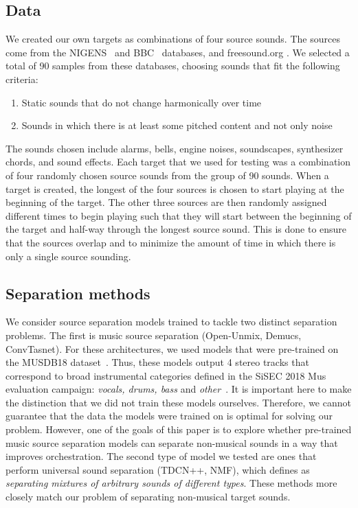 \documentclass[letterpaper]{article}  %
\begin{document}
    \subsection{Data}\label{subsec:data}
    We created our own targets as combinations of four source sounds. The sources come from the NIGENS~\cite{NIGENS} and BBC~\cite{BBC} databases, and freesound.org \cite{freesound}. We selected a total of 90 samples from these databases, choosing sounds that fit the following criteria:

    \begin{enumerate}
    	\item Static sounds that do not change harmonically over time
    	\item Sounds in which there is at least some pitched content and not only noise
    \end{enumerate}
    The sounds chosen include alarms, bells, engine noises, soundscapes, synthesizer chords, and sound effects. Each target that we used for testing was a combination of four randomly chosen source sounds from the group of 90 sounds.
    When a target is created, the longest of the four sources is chosen to start playing at the beginning of the target. The other three sources are then randomly assigned different times to begin playing such that they will start between the beginning of the target and half-way through the longest source sound. This is done to ensure that the sources overlap and to minimize the amount of time in which there is only a single source sounding.

    \subsection{Separation methods}
  We consider source separation models trained to tackle two distinct separation problems. The first is music source separation (Open-Unmix, Demucs, ConvTasnet). For these architectures, we used models that were pre-trained on the MUSDB18 dataset~\cite{MUSDB18}. Thus, these models output 4 stereo tracks that correspond to broad instrumental categories defined in the SiSEC 2018 Mus evaluation campaign: \textit{vocals, drums, bass} and \textit{other}~\cite{Stoter_SiSEC}. It is important here to make the distinction that we did not train these models ourselves. Therefore, we cannot guarantee that the data the models were trained on is optimal for solving our problem. However, one of the goals of this paper is to explore whether pre-trained music source separation models can separate non-musical sounds in a way that improves orchestration.
  The second type of model we tested are ones that perform universal sound separation (TDCN++, NMF), which \cite{tdcnpp} defines as \textit{separating mixtures of arbitrary sounds of different types}. These methods more closely match our problem of separating non-musical target sounds.
\end{document}
